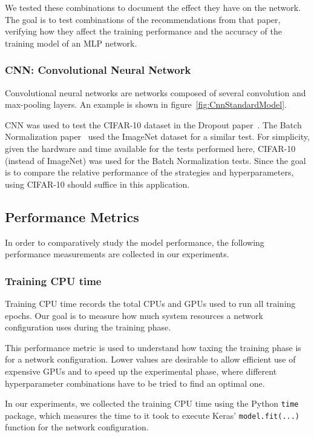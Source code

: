 \documentclass[../dropout-vs-batch-normalization.tex]{subfiles}
\begin{document}
We tested these combinations to document the effect they have on the network. The goal is to test combinations of the recommendations from that paper, verifying how they affect the training performance and the accuracy of the training model of an MLP network.

\medskip
\subsubsection{CNN: Convolutional Neural Network}

Convolutional neural networks are networks composed of several convolution and max-pooling layers. An example is shown in figure~\ref{fig:CnnStandardModel}.

CNN was used to test the CIFAR-10 dataset in the Dropout paper~\cite{Srivastava2014}. The Batch Normalization paper~\cite{Ioffe2015} used the ImageNet dataset for a similar test. For simplicity, given the hardware and time available for the tests performed here, CIFAR-10 (instead of ImageNet) was used for the Batch Normalization tests. Since the goal is to compare the relative performance of the strategies and hyperparameters, using CIFAR-10 should suffice in this application.

\subsection{Performance Metrics}

In order to comparatively study the model performance, the following performance measurements are collected in our experiments.

\medskip
\subsubsection{Training CPU time}

Training CPU time records the total CPUs and GPUs used to run all training epochs. Our goal is to measure how much system resources a network configuration uses during the training phase. 
 
This performance metric is used to understand how taxing the training phase is for a network configuration. Lower values are desirable to allow efficient use of expensive GPUs and to speed up the experimental phase, where different hyperparameter combinations have to be tried to find an optimal one.

In our experiments, we collected the training CPU time using the Python \verb|time| package, which measures the time to it took to execute Keras' \verb|model.fit(...)| function for the network configuration.
\end{document}
